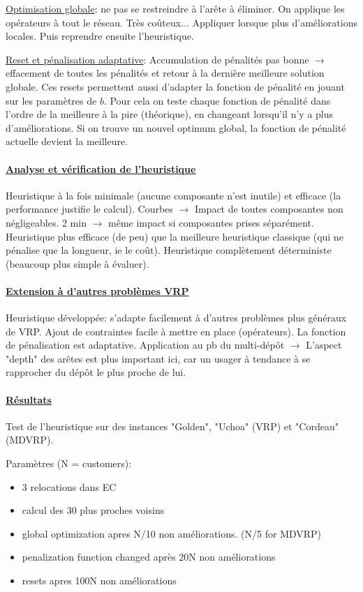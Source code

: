 \documentclass[a4paper,11pt]{report}%
\begin{document}
\underline{Optimisation globale}: ne pas se restreindre à l'arête à éliminer. On applique les opérateurs à tout le réseau. Très coûteux... Appliquer lorsque plus d'améliorations locales. Puis reprendre ensuite l'heuristique.

\underline{Reset et pénalisation adaptative}: Accumulation de pénalités pas bonne $\rightarrow$ effacement de toutes les pénalités et retour à la dernière meilleure solution globale. Ces resets permettent aussi d'adapter la fonction de pénalité en jouant sur les paramètres de $b$. Pour cela on teste chaque fonction de pénalité dans l'ordre de la meilleure à la pire (théorique), en changeant lorsqu'il n'y a plus d'améliorations. Si on trouve un nouvel optimum global, la fonction de pénalité actuelle devient la meilleure.

\paragraph{\underline{Analyse et vérification de l'heuristique}}

Heuristique à la fois minimale (aucune composante n'est inutile) et efficace (la performance justifie le calcul). Courbes $\rightarrow$ Impact de toutes composantes non négligeables. 2 min $\rightarrow$ même impact si composantes prises séparément. Heuristique plus efficace (de peu) que la meilleure heuristique classique (qui ne pénalise que la longueur, ie le coût). Heuristique complètement déterministe (beaucoup plus simple à évaluer). 


\paragraph{\underline{Extension à d'autres problèmes VRP}}

Heuristique développée: s'adapte facilement à d'autres problèmes plus généraux de VRP. Ajout de contraintes facile à mettre en place (opérateurs).
La fonction de pénalisation est adaptative. Application au pb du multi-dépôt $\rightarrow$ L'aspect "depth" des arêtes est plus important ici, car un usager à tendance à se rapprocher du dépôt le plus proche de lui.  

\paragraph{\underline{Résultats}}
Test de l'heuristique sur des instances "Golden", "Uchoa" (VRP) et "Cordeau" (MDVRP). 

Paramètres (N = customers):
\begin{itemize}
\item 3 relocations dans EC
\item calcul des 30 plus proches voisins
\item global optimization apres N/10 non améliorations. (N/5 for MDVRP)
\item penalization function changed après 20N non améliorations
\item resets apres 100N non améliorations
\end{itemize}
\end{document}
